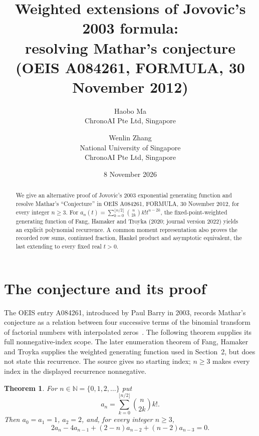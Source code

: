 \documentclass[11pt]{article}
\title{Weighted extensions of Jovovic's 2003 formula:\protect\\
resolving Mathar's conjecture\protect\\
(OEIS A084261, FORMULA, 30 November 2012)}
\author{Haobo Ma\\\small ChronoAI Pte Ltd, Singapore
\and Wenlin Zhang\\\small National University of Singapore\\
\small ChronoAI Pte Ltd, Singapore}
\date{8 November 2026}
\newtheorem{theorem}{Theorem}
\newcommand{\N}{\mathbb N}
\begin{document}
\maketitle
\begin{abstract}
We give an alternative proof of Jovovic's 2003 exponential generating
function and resolve Mathar's ``Conjecture'' in OEIS A084261,
FORMULA, 30 November 2012, for every integer $n\geq3$.
For $a_n(t)=\sum_{k=0}^{\lfloor n/2\rfloor}\binom n{2k}k!t^{n-2k}$,
the fixed-point-weighted generating function of Fang, Hamaker and
Troyka (2020; journal version 2022) yields an explicit polynomial recurrence.
A common moment representation also proves the recorded row sums,
continued fraction, Hankel product and asymptotic equivalent, the last
extending to every fixed real $t>0$.
\end{abstract}

\section{The conjecture and its proof}
The OEIS entry A084261, introduced by Paul Barry in 2003, records Mathar's
conjecture as a relation between four successive terms of the binomial
transform of factorial numbers with interpolated zeros~\cite{oeis}.
The following theorem supplies its full nonnegative-index scope.
The later enumeration theorem of Fang, Hamaker and Troyka
\cite[Proposition 4.13 and following example]{fang} supplies the weighted
generating function used in Section~2, but does not state this recurrence.
The source gives no starting index; $n\geq3$ makes every index in the displayed
recurrence nonnegative.

\begin{theorem}\label{thm:main}
For $n\in\N=\{0,1,2,\ldots\}$ put
\begin{equation}\label{eq:sum}
 a_n=\sum_{k=0}^{\lfloor n/2\rfloor}\binom n{2k}k!.
\end{equation}
Then $a_0=a_1=1$, $a_2=2$, and, for every integer $n\geq3$,
\begin{equation}\label{eq:rec}
 2a_n-4a_{n-1}+(2-n)a_{n-2}+(n-2)a_{n-3}=0.
\end{equation}
\end{theorem}
\end{document}
